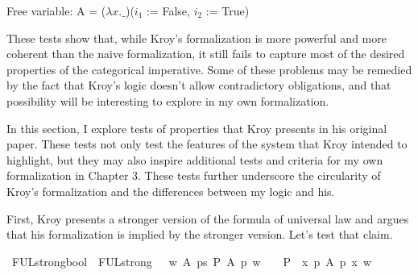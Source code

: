 \begin{isabellebody}
{  Free variable:
    A = ($\lambda x. \_$)($i_1$ := False, $i_2$ := True)\color{black}%
}%
\endisatagproof
{\isafoldproof}%
%
\isadelimproof
%
\endisadelimproof
%
\isadelimproof
%
\endisadelimproof
%
\isatagproof
%
\endisatagproof
{\isafoldproof}%
%
\isadelimproof
%
\endisadelimproof
%
\begin{isamarkuptext}%
These tests show that, while Kroy's formalization is more powerful and more coherent than the naive formalization, it 
      still fails to capture most of the desired properties of the categorical imperative. Some of these 
      problems may be remedied by the fact that Kroy's logic doesn't allow contradictory obligations, 
      and that possibility will be interesting to explore in my own formalization.%
\end{isamarkuptext}\isamarkuptrue%
%
\isadelimdocument
%
\endisadelimdocument
%
\isatagdocument
%
\isamarkuptrue%
%
\endisatagdocument
{\isafolddocument}%
%
\isadelimdocument
%
\endisadelimdocument
%
\begin{isamarkuptext}%
In this section, I explore tests of properties that Kroy presents in his original paper. These 
tests not only test the features of the system that Kroy intended to highlight, but they may also 
inspire additional tests and criteria for my own formalization in Chapter 3. These tests further underscore 
the circularity of Kroy's formalization and the differences between my logic and his.%
\end{isamarkuptext}\isamarkuptrue%
%
\begin{isamarkuptext}%
First, Kroy presents a stronger version of the formula of universal law and argues that his formalization
is implied by the stronger version. Let's test that claim.%
\end{isamarkuptext}\isamarkuptrue%
\isamarkupfalse%
\ FUL{\isacharunderscore}strong{\isacharcolon}{\isacharcolon}bool\ \ {\isachardoublequoteopen}FUL{\isacharunderscore}strong\ {\isasymequiv}\ \ {\isasymforall}w\ A{\isachardot}\ {\isacharparenleft}{\isacharparenleft}{\isasymexists}p{\isacharcolon}{\isacharcolon}s{\isachardot}\ {\isacharparenleft}{\isacharparenleft}P\ {\isacharbraceleft}A\ p{\isacharbraceright}{\isacharparenright}\ w{\isacharparenright}{\isacharparenright}\ \ {\isasymlongrightarrow}{\isacharparenleft}\ {\isacharparenleft}{\isacharparenleft}\ P\ {\isacharbraceleft}\ {\isasymlambda}x{\isachardot}\ {\isasymforall}p{\isachardot}\ A\ p\ x{\isacharbraceright}{\isacharparenright}\ w{\isacharparenright}{\isacharparenright}{\isacharparenright}{\isachardoublequoteclose}\isanewline

\end{isabellebody}
